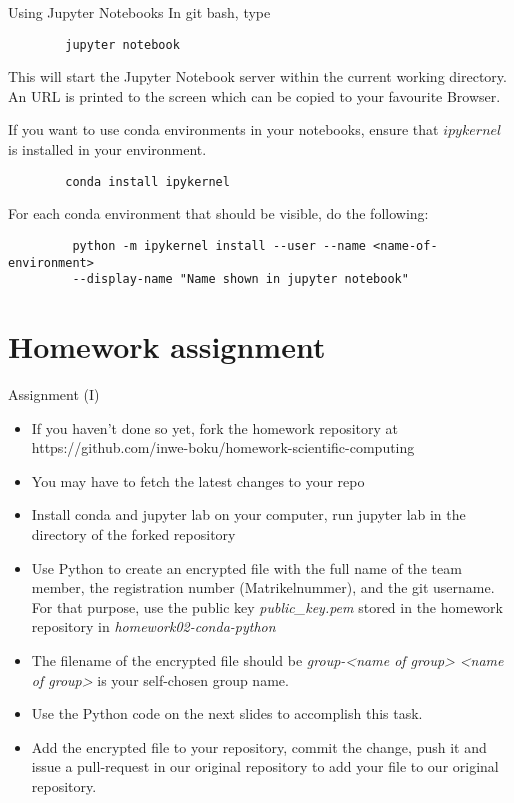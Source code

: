 \begin{frame}[fragile]{Using Jupyter Notebooks}
		In git bash, type
		\begin{verbatim}
		jupyter notebook
		\end{verbatim}
		This will start the Jupyter Notebook server within the current working directory. An URL is printed to the screen which can be copied to your favourite Browser.
		
		If you want to use conda environments in your notebooks, ensure that $ipykernel$ is installed in your environment.
		\begin{verbatim}
		conda install ipykernel
		\end{verbatim}
		For each conda environment that should be visible, do the following:
		\begin{verbatim}
		 python -m ipykernel install --user --name <name-of-environment> 
		 --display-name "Name shown in jupyter notebook"
		 \end{verbatim}
		
\end{frame}


\section{Homework assignment}

\begin{frame}{Assignment (I)}
	
	\begin{itemize}
		\item If you haven't done so yet, fork the homework repository at https://github.com/inwe-boku/homework-scientific-computing
		\item You may have to fetch the latest changes to your repo
		\item Install conda and jupyter lab on your computer, run jupyter lab in the directory of the forked repository
		\item Use Python to create an encrypted file with the full name of the team member, the registration number (Matrikelnummer), and the git username. For that purpose, use the public key \textit{public\_key.pem} stored in the homework repository in \textit{homework02-conda-python}
		\item The filename of the encrypted file should be \textit{group-<name of group>} \textit{<name of group>} is your self-chosen group name.
		\item Use the Python code on the next slides to accomplish this task.
		\item Add the encrypted file to your repository, commit the change, push it and issue a pull-request in our original repository to add your file to our original repository.
		
		
	\end{itemize}
	
	
\end{frame}

